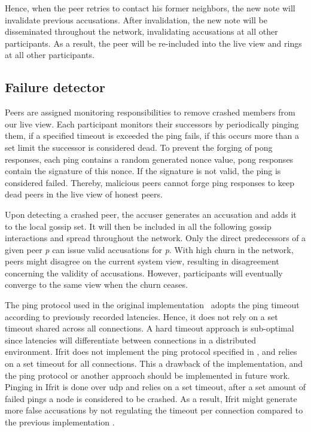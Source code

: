 \documentclass[USenglish]{uit-thesis}
\begin{document}
\begin{code}
\end{code}


Hence, when the peer retries to contact his former neighbors, the new note will invalidate previous accusations.
After invalidation, the new note will be disseminated throughout the network, invalidating accusations at all other participants.
As a result, the peer will be re-included into the live view and rings at all other participants. 


\subsection{Failure detector}
Peers are assigned monitoring responsibilities to remove crashed members from our live view.
Each participant monitors their successors by periodically pinging them, if a specified timeout is exceeded the ping fails, if this occurs more than a set limit the successor is considered dead.
To prevent the forging of pong responses, each ping contains a random generated nonce value, pong responses contain the signature of this nonce.
If the signature is not valid, the ping is considered failed.
Thereby, malicious peers cannot forge ping responses to keep dead peers in the live view of honest peers.

Upon detecting a crashed peer, the accuser generates an accusation and adds it to the local gossip set.
It will then be included in all the following gossip interactions and spread throughout the network.
Only the direct predecessors of a given peer \textit{p} can issue valid accusations for \textit{p}.
With high churn in the network, peers might disagree on the current system view, resulting in disagreement concerning the validity of accusations.
However, participants will eventually converge to the same view when the churn ceases.

The ping protocol used in the original implementation~\cite{flies} adopts the ping timeout according to previously recorded latencies. 
Hence, it does not rely on a set timeout shared across all connections.
A hard timeout approach is sub-optimal since latencies will differentiate between connections in a distributed environment.
Ifrit does not implement the ping protocol specified in \cite{flies}, and relies on a set timeout for all connections.
This a drawback of the implementation, and the ping protocol or another approach should be implemented in future work.
Pinging in Ifrit is done over \gls{udp} and relies on a set timeout, after a set amount of failed pings a node is considered to be crashed.
As a result, Ifrit might generate more false accusations by not regulating the timeout per connection compared to the previous implementation \cite{flies}.
\end{document}
